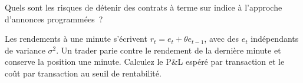 \begin{interviewq}\label{iq:s1:short-term-futures-strategies:5}
Quels sont les risques de détenir des contrats à terme sur indice à l'approche d'annonces programmées~?
\end{interviewq}

\begin{interviewq}\label{iq:s1:short-term-futures-strategies:6}
Les rendements à une minute s'écrivent $r_t = e_t + \theta e_{t-1}$, avec des $e_t$ indépendants de variance $\sigma^2$. Un trader parie contre le rendement de la dernière minute et conserve la
position une minute. Calculez le P\&L espéré par transaction et le coût par transaction au seuil de rentabilité.
\end{interviewq}
